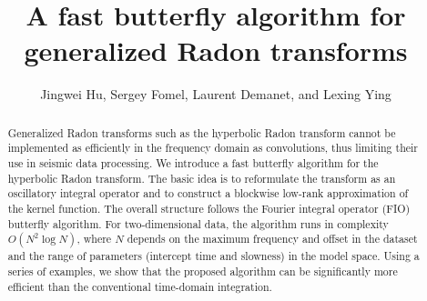 
\title{A fast butterfly algorithm for generalized Radon transforms}
\author{Jingwei Hu\footnotemark[1], Sergey Fomel\footnotemark[2], Laurent Demanet\footnotemark[3], and Lexing Ying\footnotemark[4]} 

\address{
\footnotemark[1]Institute for Computational Engineering and Sciences (ICES)\\
The University of Texas at Austin\\
201 East 24th St, Stop C0200, Austin, TX 78712, USA\\
hu@ices.utexas.edu\\
\footnotemark[2]Bureau of Economic Geology and Department of Geological Sciences\\
Jackson School of Geosciences\\
The University of Texas at Austin\\
University Station, Box X, Austin, TX 78713, USA\\
sergey.fomel@beg.utexas.edu\\
\footnotemark[3]Department of Mathematics\\
Massachusetts Institute of Technology\\
77 Massachusetts Avenue, Cambridge, MA 02139, USA\\
laurent@math.mit.edu\\
\footnotemark[4]Department of Mathematics and\\
Institute for Computational and Mathematical Engineering (ICME)\\
Stanford University\\
450 Serra Mall, Bldg 380, Stanford, CA 94305, USA\\
lexing@math.stanford.edu
}



\maketitle

\begin{abstract}
Generalized Radon transforms such as the hyperbolic Radon transform cannot be implemented as efficiently in the frequency domain as convolutions, thus limiting their use in seismic data processing. We introduce a fast butterfly algorithm for the hyperbolic Radon transform. The basic idea is to reformulate the transform as an oscillatory integral operator and to construct a blockwise low-rank approximation of the kernel function. The overall structure follows the Fourier integral operator (FIO) butterfly algorithm. For two-dimensional data, the algorithm runs in complexity $O(N^2\log N)$, where $N$ depends on the maximum frequency and offset in the dataset and the range of parameters (intercept time and slowness) in the model space. Using a series of examples, we show that the proposed algorithm can be significantly more efficient than the conventional time-domain integration.
\end{abstract}


